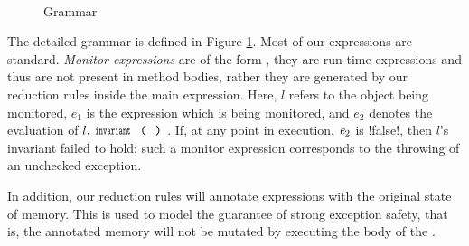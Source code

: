 \begin{figure}
\begin{grammatica}
		
		\\
		\\
		\\
		\\
		\\
		\\
	\end{grammatica}
	\caption{Grammar}\label{f:grammar}
\end{figure}


The detailed grammar is defined in Figure \ref{f:grammar}. 
Most of our expressions are standard.
\emph{Monitor expressions}
 are of the form , they 
are run time expressions and thus are not present in method bodies, rather they are generated by our reduction rules inside the main expression. Here, $l$ refers to the object being monitored, $e_1$ is the expression which is being monitored, and $e_2$ denotes the evaluation of $l.\invariant$. If, at any point in execution, ${\mathit{e}}_2$ is \Q!false!, then $l$'s invariant failed to hold; such a monitor expression corresponds to the throwing of an unchecked exception.

In addition, our reduction rules will annotate \Q@try@ expressions with
the original state of memory. This is used to model the guarantee of strong exception safety, that is, the annotated memory will not be mutated by executing the body of the \Q@try@.

